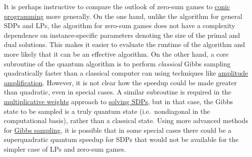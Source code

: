 \begin{refsection}
It is perhaps instructive to compare the outlook of zero-sum games to \hyperref[appl:ConicProgramming]{conic programming} more generally. On the one hand, unlike the algorithm for general SDPs and LPs, the algorithm for zero-sum games does not have a complexity dependence on instance-specific parameters denoting the size of the primal and dual solutions. This makes it easier to evaluate the runtime of the algorithm and more likely that it can be an effective algorithm. On the other hand, a core subroutine of the quantum algorithm is to perform \emph{classical} Gibbs sampling quadratically faster than a classical computer can using techniques like \hyperref[prim:AmpAmp]{amplitude amplification}. However, it is not clear how the speedup could be made greater than quadratic, even in special cases.  A similar subroutine is required in the \hyperref[prim:MWU]{multiplicative weights} approach to \hyperref[appl:ConicProgramming]{solving SDPs}, but in that case, the Gibbs state to be sampled is a truly quantum state (i.e.~nondiagonal in the computational basis), rather than a classical state. Using more advanced methods for \hyperref[prim:GibbsSampling]{Gibbs sampling}, it is possible that in some special cases there could be a superquadratic quantum speedup for SDPs that would not be available for the simpler case of LPs and zero-sum games. 

\printbibliography[heading=secbib,segment=\therefsegment]
\end{refsection}

\newpage

